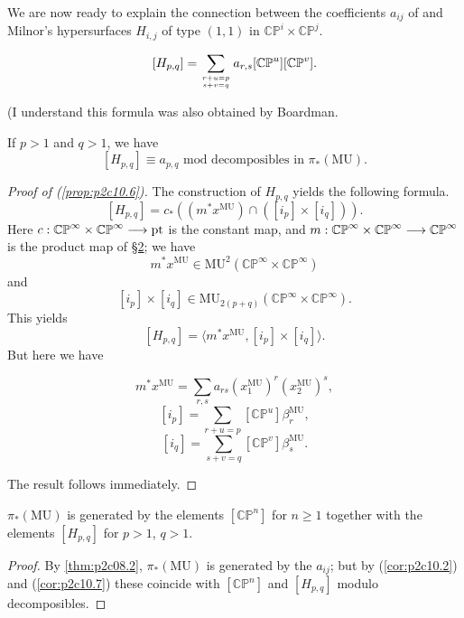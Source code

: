 \documentclass[../main]{subfiles}
\begin{document}
We are now ready to explain the connection between the coefficients $a_{ij}$ of  and Milnor's hypersurfaces $H_{i, j}$ of type $(1, 1)$ in $\mathbb {CP}^i \times \mathbb {CP}^j$.

\begin{proposition}
\label{prop:p2c10.6}
$$[H_{p, q}] = \sum_{{r + u = p} \atop {s + v = q}} a_{r, s} [\mathbb {CP}^u] [\mathbb {CP}^v].$$
\end{proposition}
(I understand this formula was also obtained by Boardman.
\begin{corollary}
\label{cor:p2c10.7}
If $p > 1$ and $q > 1$, we have $$[H_{p, q}] \equiv a_{p, q} \text { mod decomposibles in } \pi_\ast(\mathrm {MU}).$$
\end{corollary}

\begin{proof}[Proof of (\ref{prop:p2c10.6})]
The construction of $H_{p, q}$ yields the following formula. $$[H_{p, q}] = c_\ast ((m^\ast x^{\mathrm{MU}}) \cap ([i_p] \times [i_q])).$$ Here $c : \mathbb {CP}^\infty \times \mathbb {CP}^\infty \overset{}{\longrightarrow} \mathrm{pt}$ is the constant map, and $m : \mathbb {CP}^\infty \times \mathbb {CP}^\infty \overset{}{\longrightarrow} \mathbb {CP}^\infty$ is the product map of \hyperref[sec:p2c2]{\S 2}; we have $$m^\ast x^{\mathrm{MU}} \in \mathrm{MU}^2(\mathbb {CP}^\infty \times \mathbb {CP}^\infty)$$ and $$[i_p] \times [i_q] \in \mathrm{MU}_{2(p + q)} (\mathbb {CP}^\infty \times \mathbb {CP}^\infty).$$ This yields $$[H_{p, q}] = \langle m^\ast x^{\mathrm{MU}}, [i_p] \times [i_q]\rangle.$$ But here we have

$$m^\ast x^{\mathrm{MU}} = \sum_{r, s} a_{rs} (x_1^{\mathrm{MU}})^r (x_2^{\mathrm{MU}})^s,$$
$$[i_p] = \sum_{r + u = p} [\mathbb {CP}^u] \beta_r^{\mathrm{MU}},$$
$$[i_q] = \sum_{s + v = q} [\mathbb {CP}^v] \beta_s^{\mathrm{MU}}.$$

The result follows immediately. 
\end{proof} 

\begin{corollary}
\label{cor:p2c10.8}
$\pi_\ast(\mathrm {MU})$ is generated by the elements $[\mathbb {CP}^n]$ for $n \ge 1$ together with the elements $[H_{p, q}]$ for $p > 1$, $q > 1$. 
\end{corollary}

\begin{proof}
By \ref{thm:p2c08.2}, $\pi_\ast(\mathrm{MU})$ is generated by the $a_{ij}$; but by (\ref{cor:p2c10.2}) and (\ref{cor:p2c10.7}) these coincide with $[\mathbb {CP}^n]$ and $[H_{p, q}]$ modulo decomposibles. 
\end{proof} 
\end{document}
